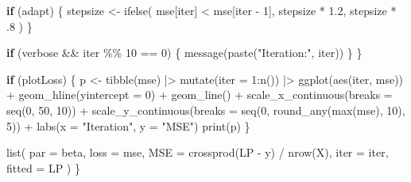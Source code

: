 \documentclass[
  letterpaper,
]{krantz}
\newenvironment{Shaded}{}{}
\newcommand{\AttributeTok}[1]{\textcolor[rgb]{0.49,0.56,0.16}{#1}}
\newcommand{\ControlFlowTok}[1]{\textcolor[rgb]{0.00,0.44,0.13}{\textbf{#1}}}
\newcommand{\DecValTok}[1]{\textcolor[rgb]{0.25,0.63,0.44}{#1}}
\newcommand{\FloatTok}[1]{\textcolor[rgb]{0.25,0.63,0.44}{#1}}
\newcommand{\FunctionTok}[1]{\textcolor[rgb]{0.02,0.16,0.49}{#1}}
\newcommand{\NormalTok}[1]{#1}
\newcommand{\OtherTok}[1]{\textcolor[rgb]{0.00,0.44,0.13}{#1}}
\newcommand{\SpecialCharTok}[1]{\textcolor[rgb]{0.25,0.44,0.63}{#1}}
\newcommand{\StringTok}[1]{\textcolor[rgb]{0.25,0.44,0.63}{#1}}
\begin{document}
\begin{Shaded}
\begin{Highlighting}[]
        \ControlFlowTok{if}\NormalTok{ (adapt) \{}
\NormalTok{            stepsize }\OtherTok{\textless{}{-}} \FunctionTok{ifelse}\NormalTok{(}
\NormalTok{                mse[iter] }\SpecialCharTok{\textless{}}\NormalTok{ mse[iter }\SpecialCharTok{{-}} \DecValTok{1}\NormalTok{],}
\NormalTok{                stepsize }\SpecialCharTok{*} \FloatTok{1.2}\NormalTok{,}
\NormalTok{                stepsize }\SpecialCharTok{*}\NormalTok{ .}\DecValTok{8}
\NormalTok{            )}
\NormalTok{        \}}

        \ControlFlowTok{if}\NormalTok{ (verbose }\SpecialCharTok{\&\&}\NormalTok{ iter }\SpecialCharTok{\%\%} \DecValTok{10} \SpecialCharTok{==} \DecValTok{0}\NormalTok{) \{}
            \FunctionTok{message}\NormalTok{(}\FunctionTok{paste}\NormalTok{(}\StringTok{"Iteration:"}\NormalTok{, iter))}
\NormalTok{        \}}
\NormalTok{    \}}

    \ControlFlowTok{if}\NormalTok{ (plotLoss) \{}
\NormalTok{        p }\OtherTok{\textless{}{-}} \FunctionTok{tibble}\NormalTok{(mse) }\SpecialCharTok{|\textgreater{}}
            \FunctionTok{mutate}\NormalTok{(}\AttributeTok{iter =} \DecValTok{1}\SpecialCharTok{:}\FunctionTok{n}\NormalTok{()) }\SpecialCharTok{|\textgreater{}}
            \FunctionTok{ggplot}\NormalTok{(}\FunctionTok{aes}\NormalTok{(iter, mse)) }\SpecialCharTok{+}
            \FunctionTok{geom\_hline}\NormalTok{(}\AttributeTok{yintercept =} \DecValTok{0}\NormalTok{) }\SpecialCharTok{+}
            \FunctionTok{geom\_line}\NormalTok{() }\SpecialCharTok{+}
            \FunctionTok{scale\_x\_continuous}\NormalTok{(}\AttributeTok{breaks =} \FunctionTok{seq}\NormalTok{(}\DecValTok{0}\NormalTok{, }\DecValTok{50}\NormalTok{, }\DecValTok{10}\NormalTok{)) }\SpecialCharTok{+}
            \FunctionTok{scale\_y\_continuous}\NormalTok{(}\AttributeTok{breaks =} \FunctionTok{seq}\NormalTok{(}\DecValTok{0}\NormalTok{, }\FunctionTok{round\_any}\NormalTok{(}\FunctionTok{max}\NormalTok{(mse), }\DecValTok{10}\NormalTok{), }\DecValTok{5}\NormalTok{)) }\SpecialCharTok{+}
            \FunctionTok{labs}\NormalTok{(}\AttributeTok{x =} \StringTok{"Iteration"}\NormalTok{, }\AttributeTok{y =} \StringTok{"MSE"}\NormalTok{)}
        \FunctionTok{print}\NormalTok{(p)}
\NormalTok{    \}}

    \FunctionTok{list}\NormalTok{(}
        \AttributeTok{par    =}\NormalTok{ beta,}
        \AttributeTok{loss   =}\NormalTok{ mse,}
        \AttributeTok{MSE    =} \FunctionTok{crossprod}\NormalTok{(LP }\SpecialCharTok{{-}}\NormalTok{ y) }\SpecialCharTok{/} \FunctionTok{nrow}\NormalTok{(X),}
        \AttributeTok{iter   =}\NormalTok{ iter,}
        \AttributeTok{fitted =}\NormalTok{ LP}
\NormalTok{    )}
\NormalTok{\}}


\end{Highlighting}
\end{Shaded}
\end{document}

